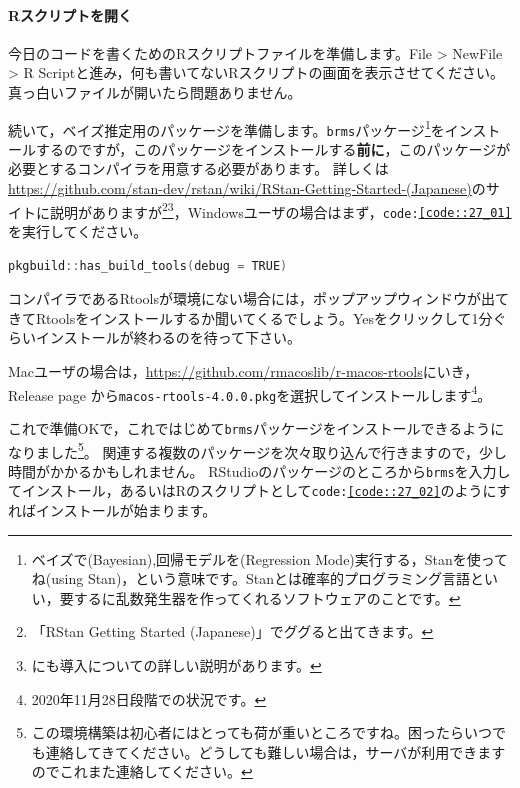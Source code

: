 \documentclass{ltjbook}
\begin{document}
\paragraph{Rスクリプトを開く}今日のコードを書くためのRスクリプトファイルを準備します。File > NewFile > R Scriptと進み，何も書いてないRスクリプトの画面を表示させてください。真っ白いファイルが開いたら問題ありません。

続いて，ベイズ推定用のパッケージを準備します。\texttt{brms}パッケージ\footnote{ベイズで(Bayesian),回帰モデルを(Regression Mode)実行する，Stanを使ってね(using Stan)，という意味です。Stanとは確率的プログラミング言語といい，要するに乱数発生器を作ってくれるソフトウェアのことです。}をインストールするのですが，このパッケージをインストールする\textbf{前に}，このパッケージが必要とするコンパイラを用意する必要があります。
詳しくは \url{https://github.com/stan-dev/rstan/wiki/RStan-Getting-Started-(Japanese)}のサイトに説明がありますが\footnote{「RStan Getting Started (Japanese)」でググると出てきます。}\footnote{\citet{馬場201907}にも導入についての詳しい説明があります。}，Windowsユーザの場合はまず，\texttt{code:\ref{code::27_01}}を実行してください。
\begin{lstlisting}[language=c++,label={code::27_01},caption={必要なツールをインストールする}]
pkgbuild::has_build_tools(debug = TRUE)
\end{lstlisting}

コンパイラであるRtoolsが環境にない場合には，ポップアップウィンドウが出てきてRtoolsをインストールするか聞いてくるでしょう。Yesをクリックして1分ぐらいインストールが終わるのを待って下さい。

Macユーザの場合は，\url{https://github.com/rmacoslib/r-macos-rtools}にいき，Release page から\texttt{macos-rtools-4.0.0.pkg}を選択してインストールします\footnote{2020年11月28日段階での状況です。}。

これで準備OKで，これではじめて\texttt{brms}パッケージをインストールできるようになりました\footnote{この環境構築は初心者にはとっても荷が重いところですね。困ったらいつでも連絡してきてください。どうしても難しい場合は，サーバが利用できますのでこれまた連絡してください。}。
関連する複数のパッケージを次々取り込んで行きますので，少し時間がかかるかもしれません。 
RStudioのパッケージのところから\texttt{brms}を入力してインストール，あるいはRのスクリプトとして\texttt{code:\ref{code::27_02}}のようにすればインストールが始まります。
\end{document}
